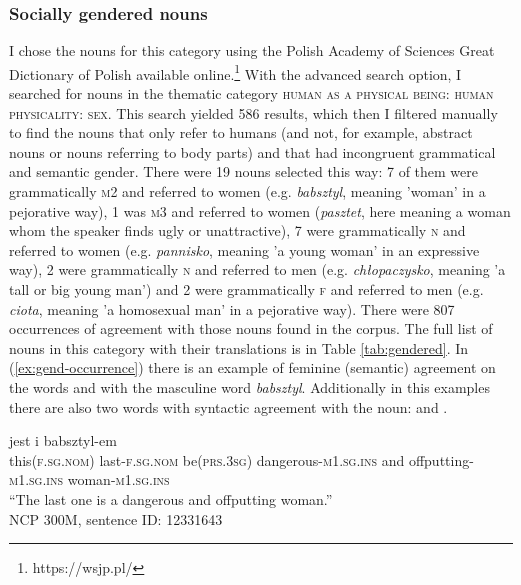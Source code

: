 \subsubsection{Socially gendered nouns}
I chose the nouns for this category using the Polish Academy of Sciences Great Dictionary of Polish available online.\footnote{https://wsjp.pl/} With the advanced search option, I searched for nouns in the thematic category \textsc{human as a physical being: human physicality: sex}. This search yielded 586 results, which then I filtered manually to find the nouns that only refer to humans (and not, for example, abstract nouns or nouns referring to body parts) and that had incongruent grammatical and semantic gender. There were 19 nouns selected this way: 7 of them were grammatically \textsc{m2} and referred to women (e.g. \textsl{babsztyl}, meaning 'woman' in a pejorative way), 1 was \textsc{m3} and referred to women (\textsl{pasztet}, here meaning a woman whom the speaker finds ugly or unattractive), 7 were grammatically \textsc{n} and referred to women (e.g. \textsl{pannisko}, meaning 'a young woman' in an expressive way), 2 were grammatically \textsc{n} and referred to men (e.g. \textsl{chłopaczysko}, meaning 'a tall or big young man') and 2 were grammatically \textsc{f} and referred to men (e.g. \textsl{ciota}, meaning 'a homosexual man' in a pejorative way). There were 807 occurrences of agreement with those nouns found in the corpus. The full list of nouns in this category with their translations is in Table \ref{tab:gendered}. In (\ref{ex:gend-occurrence}) there is an example of feminine (semantic) agreement on the words  and  with the masculine word \textsl{babsztyl}. Additionally in this examples there are also two words with syntactic agreement with the noun:  and .

\begin{exe}
  \ex\label{ex:gend-occurrence}
  \gll {}  jest  i  babsztyl-em\\
  this\textsc{(f.sg.nom)} last\textsc{-f.sg.nom} be\textsc{(prs.3sg)} dangerous\textsc{-m1.sg.ins} and offputting\textsc{-m1.sg.ins} woman\textsc{-m1.sg.ins}\\
  \glt ``The last one is a dangerous and offputting woman.''\\
  NCP 300M, sentence ID: 12331643
\end{exe}

